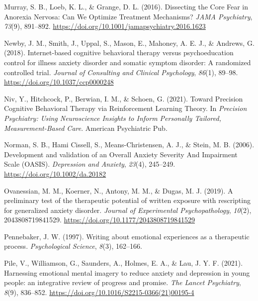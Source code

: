 \documentclass[
  man,floatsintext]{apa7}
\newlength{\cslhangindent}
\newlength{\cslentryspacingunit} %
\newenvironment{CSLReferences}[2] %
 {%
  \setlength{\parindent}{0pt}
  \ifodd #1
  \let\oldpar\par
  \def\par{\hangindent=\cslhangindent\oldpar}
  \fi
  \setlength{\parskip}{#2\cslentryspacingunit}
 }%
 {}
\begin{document}
\begin{CSLReferences}{1}{0}
\leavevmode{}%
Murray, S. B., Loeb, K. L., \& Grange, D. L. (2016). Dissecting the Core Fear in Anorexia Nervosa: Can We Optimize Treatment Mechanisms? \emph{JAMA Psychiatry}, \emph{73}(9), 891--892. \url{https://doi.org/10.1001/jamapsychiatry.2016.1623}

\leavevmode{}%
Newby, J. M., Smith, J., Uppal, S., Mason, E., Mahoney, A. E. J., \& Andrews, G. (2018). Internet-based cognitive behavioral therapy versus psychoeducation control for illness anxiety disorder and somatic symptom disorder: A randomized controlled trial. \emph{Journal of Consulting and Clinical Psychology}, \emph{86}(1), 89--98. \url{https://doi.org/10.1037/ccp0000248}

\leavevmode{}%
Niv, Y., Hitchcock, P., Berwian, I. M., \& Schoen, G. (2021). Toward Precision Cognitive Behavioral Therapy via Reinforcement Learning Theory. In \emph{Precision Psychiatry: Using Neuroscience Insights to Inform Personally Tailored, Measurement-Based Care}. American Psychiatric Pub.

\leavevmode{}%
Norman, S. B., Hami Cissell, S., Means-Christensen, A. J., \& Stein, M. B. (2006). Development and validation of an Overall Anxiety Severity And Impairment Scale (OASIS). \emph{Depression and Anxiety}, \emph{23}(4), 245--249. \url{https://doi.org/10.1002/da.20182}

\leavevmode{}%
Ovanessian, M. M., Koerner, N., Antony, M. M., \& Dugas, M. J. (2019). A preliminary test of the therapeutic potential of written exposure with rescripting for generalized anxiety disorder. \emph{Journal of Experimental Psychopathology}, \emph{10}(2), 2043808719841529. \url{https://doi.org/10.1177/2043808719841529}

\leavevmode{}%
Pennebaker, J. W. (1997). Writing about emotional experiences as a therapeutic process. \emph{Psychological Science}, \emph{8}(3), 162--166.

\leavevmode{}%
Pile, V., Williamson, G., Saunders, A., Holmes, E. A., \& Lau, J. Y. F. (2021). Harnessing emotional mental imagery to reduce anxiety and depression in young people: an integrative review of progress and promise. \emph{The Lancet Psychiatry}, \emph{8}(9), 836--852. \url{https://doi.org/10.1016/S2215-0366(21)00195-4}


\end{CSLReferences}
\end{document}
